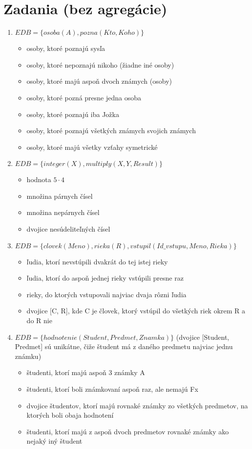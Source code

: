 \documentclass[10pt, a4paper]{article}
\theoremstyle{definition}
\begin{document}
\section{Zadania (bez agregácie)}

\begin{enumerate}
\item 
$EDB = \{osoba(A), pozna(Kto, Koho)\}$
\begin{itemize}
    \item osoby, ktoré poznajú sysľa
    \item osoby, ktoré nepoznajú nikoho (žiadne iné osoby)
    \item osoby, ktoré majú aspoň dvoch známych (osoby)
    \item osoby, ktoré pozná presne jedna osoba
    \item osoby, ktoré poznajú iba Jožka
    \item osoby, ktoré poznajú všetkých známych svojich známych
    \item osoby, ktoré majú všetky vzťahy symetrické
\end{itemize}

\item $EDB = \{integer(X), multiply(X, Y, Result)\}$
\begin{itemize}
    \item hodnota $5\cdot 4$
    \item množina párnych čísel
    \item množina nepárnych čísel
    \item dvojice nesúdeliteľných čísel
\end{itemize}

\item $EDB = \{clovek(Meno), rieka(R), vstupil(Id\_vstupu, Meno, Rieka)\}$
\begin{itemize}
    \item ľudia, ktorí nevstúpili dvakrát do tej istej rieky
    \item ľudia, ktorí do aspoň jednej rieky vstúpili presne raz
    \item rieky, do ktorých vstupovali najviac dvaja rôzni ľudia
    \item dvojice [C, R], kde C je človek, ktorý vstúpil do všetkých riek okrem R a do R nie
\end{itemize}

\item $EDB=\{hodnotenie(Student, Predmet, Znamka)\}$ (dvojice [Student, Predmet] sú unikátne, čiže študent má z daného predmetu najviac jednu známku)
\begin{itemize}
    \item študenti, ktorí majú aspoň 3 známky A
    \item študenti, ktorí boli známkovaní aspoň raz, ale nemajú Fx
    \item dvojice študentov, ktorí majú rovnaké známky zo všetkých predmetov, na ktorých boli obaja hodnotení
    \item študenti, ktorí majú z aspoň dvoch predmetov rovnaké známky ako nejaký iný študent
\end{itemize}


\end{enumerate}
\end{document}
